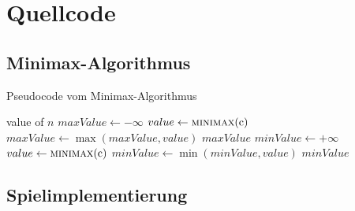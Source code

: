\chapter{Quellcode}
\label{anhang:chapter-quellcode}



\section{Minimax-Algorithmus}


\begin{algorithm}
    \caption{Pseudocode vom Minimax-Algorithmus}
    \label{algo:minimax}
    \begin{algorithmic}[1]
        \State \Return value of $n$
        \State $maxValue \gets -\infty$
        \State $value \gets \Call{minimax}{$c$}$
        \State $maxValue \gets \max(maxValue, value)$
        \EndFor
        \State \Return $maxValue$
        \State $minValue \gets +\infty$
        \State $value \gets \Call{minimax}{$c$}$
        \State $minValue \gets \min(minValue, value)$
        \EndFor
        \State \Return $minValue$
        \EndIf
        \EndFunction
    \end{algorithmic}
\end{algorithm}

\pagebreak

\section{Spielimplementierung}
\label{anhang:section-quellcode-game-implementation}



\pagebreak



